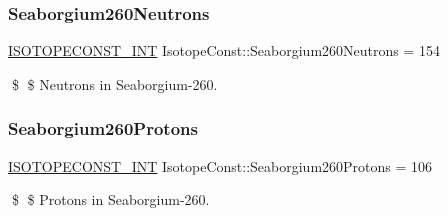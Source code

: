 \subsubsection{\texorpdfstring{Seaborgium260\+Neutrons}{Seaborgium260Neutrons}}
{\footnotesize\ttfamily \mbox{\hyperlink{group___isotope_const-_macros_ga5f18360b3e99483a35c32d789e62621c}{I\+S\+O\+T\+O\+P\+E\+C\+O\+N\+S\+T\+\_\+\+I\+NT}} Isotope\+Const\+::\+Seaborgium260\+Neutrons = 154}

\$ \$ Neutrons in Seaborgium-\/260. \mbox{\label{group___isotope_const-_seaborgium-_sg260_ga6daf409d7dcb2e3caf11349bf6679d35}} 
\subsubsection{\texorpdfstring{Seaborgium260\+Protons}{Seaborgium260Protons}}
{\footnotesize\ttfamily \mbox{\hyperlink{group___isotope_const-_macros_ga5f18360b3e99483a35c32d789e62621c}{I\+S\+O\+T\+O\+P\+E\+C\+O\+N\+S\+T\+\_\+\+I\+NT}} Isotope\+Const\+::\+Seaborgium260\+Protons = 106}

\$ \$ Protons in Seaborgium-\/260. 